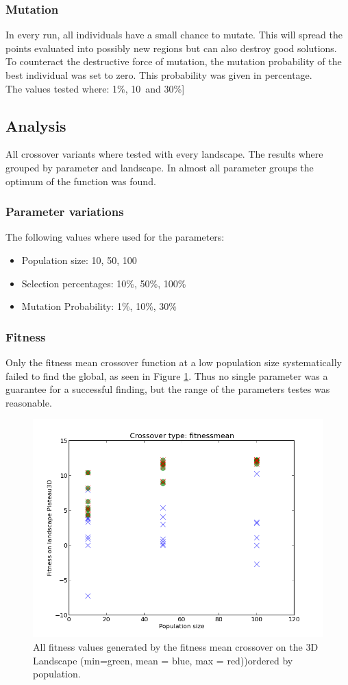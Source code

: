 \documentclass{scrartcl}
\begin{document}
\subsubsection{Mutation}
In every run, all individuals have a small chance to mutate. This will spread the points evaluated into possibly new regions but can also destroy good solutions. To counteract the destructive force of mutation, the mutation probability of the best individual was set to zero.
This probability was given in percentage.\\
The values tested where: 1\%, 10\ and 30\%]


\subsection{Analysis}
All crossover variants where tested with every landscape. The results where grouped by parameter and landscape. In almost all parameter groups the optimum of the function was found. 

\subsubsection{Parameter variations}
The following values where used for the parameters:
\begin{itemize}
\item Population size: 10, 50, 100
\item Selection percentages: 10\%, 50\%, 100\%
\item Mutation Probability: 1\%, 10\%, 30\%
 \end{itemize}

\subsubsection{Fitness}
Only the fitness mean crossover function at a low population size systematically failed to find the global, as seen in Figure \ref{fig:fitnessmeanpop}. Thus no single parameter was a guarantee for a successful finding, but the range of the parameters testes was reasonable.


\begin{figure}
 \center
 \includegraphics[width=.5\linewidth]{img/ex2/fitnessmean-Plateau3D-pop.png} 
 \caption{All fitness values generated by the fitness mean crossover on the 3D Landscape (min=green, mean = blue, max = red))ordered by population.}
 \label{fig:fitnessmeanpop}
\end{figure}
\end{document}
